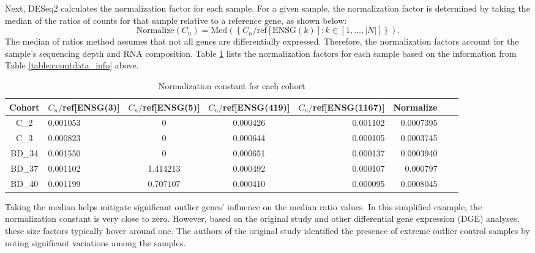 \documentclass{article}
\begin{document}
Next, DESeq2 calculates the normalization factor for each sample. For a given sample, the normalization factor is determined by taking the median of the ratios of counts for that sample relative to a reference gene, as shown below:
\[
\text{Normalize}(C_n) = \text{Med}\left(\left\{C_n/\text{ref}[\text{ENSG}(k)] : k \in [1, \ldots, |N|]\right\}\right).
\]
The median of ratios method assumes that not all genes are differentially expressed. Therefore, the normalization factors account for the sample's sequencing depth and RNA composition. Table \ref{table:normalization_count} lists the normalization factors for each sample based on the information from Table \ref{table:countdata_info} above.
\begin{table}[H]
\centering
\begin{tabular}{clccrrrr}
\toprule
Cohort & $C_n/$ref[ENSG(3)] & $C_n/$ref[ENSG(5)] & $C_n/$ref[ENSG(419)] & $C_n/$ref[ENSG(1167)] & Normalize \\
\midrule
C\_2   & 0.001053 & 0        & 0.000426 & 0.001102 & 0.0007395 \\
C\_3   & 0.000823 & 0        & 0.000644 & 0.000105 & 0.0003745 \\
BD\_34 & 0.001550 & 0        & 0.000651 & 0.000137 & 0.0003940 \\
BD\_37 & 0.001102 & 1.414213 & 0.000492 & 0.000107 & 0.000797  \\
BD\_40 & 0.001199 & 0.707107 & 0.000410 & 0.000095 & 0.0008045 \\
\bottomrule
\end{tabular}
\caption{Normalization constant for each cohort}
\label{table:normalization_count}
\end{table}
Taking the median helps mitigate significant outlier genes' influence on the median ratio values. In this simplified example, the normalization constant is very close to zero. However, based on the original study and other differential gene expression (DGE) analyses, these size factors typically hover around one. The authors of the original study identified the presence of extreme outlier control samples by noting significant variations among the samples.
\end{document}
